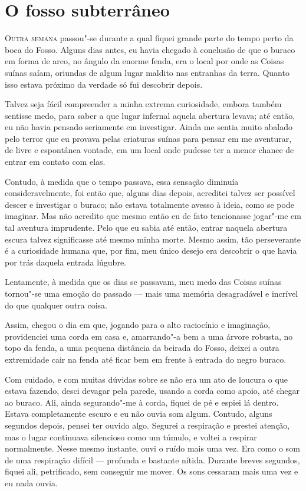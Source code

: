 \clearpage

\chapter{O fosso subterrâneo}

\textsc{Outra semana} passou"-se durante a qual fiquei grande parte do tempo perto da boca do Fosso. Alguns dias antes, eu havia
chegado à conclusão de que o buraco em forma de arco, no ângulo da enorme fenda, era o local por onde as Coisas suínas
saíam, oriundas de algum lugar maldito nas entranhas da terra. Quanto isso estava próximo da verdade só fui descobrir
depois.


Talvez seja fácil compreender a minha extrema curiosidade, embora também sentisse medo, para saber a que lugar infernal
aquela abertura levava; até então, eu não havia pensado seriamente em investigar. Ainda me sentia muito abalado
pelo terror que eu provava pelas criaturas suínas para pensar em me aventurar, de livre e espontânea vontade, em um local
onde pudesse ter a menor chance de entrar em contato com elas.

Contudo, à medida que o tempo passava, essa sensação diminuía consideravelmente, foi então que, alguns dias depois,
acreditei talvez ser possível descer e investigar o buraco; não estava totalmente avesso à ideia, como se pode
imaginar. Mas não acredito que mesmo então eu de fato tencionasse jogar"-me em tal aventura imprudente. Pelo que eu sabia
até então, entrar naquela abertura escura talvez significasse até mesmo minha morte. Mesmo assim, tão perseverante é a
curiosidade humana que, por fim, meu único desejo era descobrir o que havia por trás daquela entrada lúgubre.

Lentamente, à medida que os dias se passavam, meu medo das Coisas suínas tornou"-se uma emoção do passado --- mais uma
memória desagradável e incrível do que qualquer outra coisa.

Assim, chegou o dia em que, jogando para o alto raciocínio e imaginação, providenciei uma corda em casa e,
amarrando"-a bem a uma árvore robusta, no topo da fenda, a uma pequena distância da beirada do Fosso, deixei a outra
extremidade cair na fenda até ficar bem em frente à entrada do negro buraco.

Com cuidado, e com muitas dúvidas sobre se não era um ato de loucura o que estava fazendo, desci devagar
pela parede, usando a corda como apoio, até chegar ao buraco. Ali, ainda segurando"-me à corda, fiquei de pé e espiei lá
dentro. Estava completamente escuro e eu não ouvia som algum. Contudo, alguns segundos depois, pensei ter ouvido algo.
Segurei a respiração e prestei atenção, mas o lugar continuava silencioso como um túmulo, e voltei a respirar normalmente.
Nesse mesmo instante, ouvi o ruído mais uma vez. Era como o som de uma respiração difícil --- profunda e bastante nítida.
Durante breves segundos, fiquei ali, petrificado, sem conseguir me mover. Os sons cessaram mais uma vez e eu
nada ouvia.

